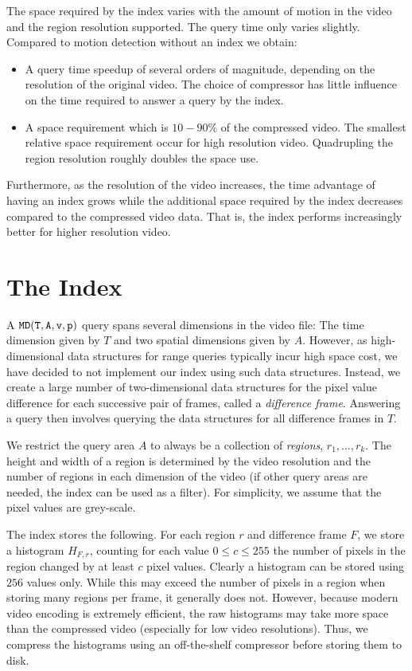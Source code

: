 The space required by the index varies with the amount of motion in the video and the region resolution supported. The query time only varies slightly. Compared to motion detection without an index we obtain: 
\begin{itemize}
    \item A query time speedup of several orders of magnitude, depending on the resolution of the original video. The choice of compressor has little influence on the time required to answer a query by the index.
    \item A space requirement which is $10-90\%$ of the compressed video. The smallest relative space requirement occur for high resolution video. Quadrupling the region resolution roughly doubles the space use.
\end{itemize}
Furthermore, as the resolution of the video increases, the time advantage of having an index grows while the additional space required by the index decreases compared to the compressed video data. That is, the index performs increasingly better for higher resolution video.

\section{The Index}
A $\mathtt{MD(T, A, v, p)}$ query spans several dimensions in the video file: The time dimension given by $T$ and two spatial dimensions given by $A$. However, as high-dimensional data structures for range queries typically incur high space cost, we have decided to not implement our index using such data structures. Instead, we create a large number of two-dimensional data structures for the pixel value difference for each successive pair of frames, called a \emph{difference frame}. Answering a query then involves querying the data structures for all difference frames in $T$.

We restrict the query area $A$ to always be a collection of \emph{regions}, $r_1, \ldots, r_k$. The height and width of a region is determined by the video resolution and the number of regions in each dimension of the video (if other query areas are needed, the index can be used as a filter).  For simplicity, we assume that the pixel values are grey-scale.

The index stores the following. For each region $r$ and difference frame $F$, we store a histogram $H_{F,r}$, counting for each value $0 \leq c \leq 255$ the number of pixels in the region changed by at least $c$ pixel values. Clearly a histogram can be stored using $256$ values only. While this may exceed the number of pixels in a region when storing many regions per frame, it generally does not. However, because modern video encoding is extremely efficient, the raw histograms may take more space than the compressed video (especially for low video resolutions). Thus, we compress the histograms using an off-the-shelf compressor before storing them to disk.

